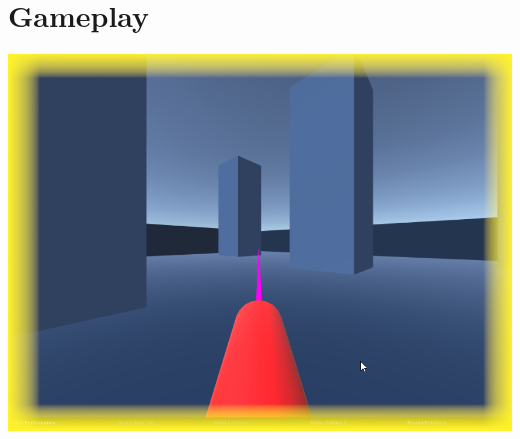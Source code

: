 \documentclass[12pt,a4paper]{article}
\begin{document}
\section{Gameplay}
\begin{center}
\includegraphics[scale=0.75]{gameplay}
\end{center}
\end{document}
